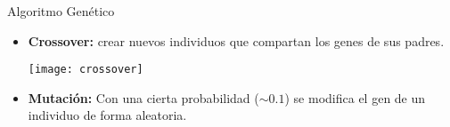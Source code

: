 \documentclass[center,10pt,cm]{beamer}
\begin{document}
\begin{frame}{Algoritmo Gen\'etico}
\begin{itemize}
{\begin{description}

    \end{description}
    }

    \item {\bf Crossover:} crear nuevos individuos que compartan los genes de sus padres.

      \begin{center}
      \texttt{[image: crossover]}
      \end{center}

    \item {\bf Mutaci\'on:} Con una cierta probabilidad ($\sim 0.1$) se modifica el gen de un individuo de forma aleatoria.


  \end{itemize}
\end{frame}
\end{document}
